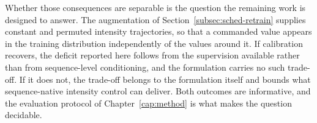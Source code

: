 Whether those consequences are separable is the question the remaining work is designed to
answer. The augmentation of Section~\ref{subsec:sched-retrain} supplies constant and permuted
intensity trajectories, so that a commanded value appears in the training distribution
independently of the values around it. If calibration recovers, the deficit reported here follows
from the supervision available rather than from sequence-level conditioning, and the formulation
carries no such trade-off. If it does not, the trade-off belongs to the formulation itself and
bounds what sequence-native intensity control can deliver. Both outcomes are informative, and the
evaluation protocol of Chapter~\ref{cap:method} is what makes the question decidable.
